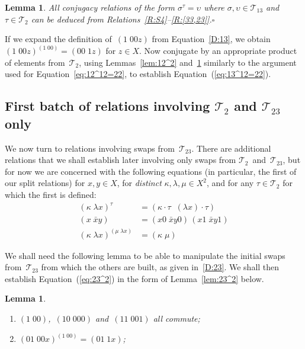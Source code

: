 \documentclass[a4paper,11pt]{article}
\numberwithin{equation}{section}
\newcommand{\eqstate}[1]{Equation~(\ref{#1})}
\newcommand{\swap}[2]{(#1\;#2)}
\newcommand{\Sw}[1]{\mathcal{T}_{#1}}
\newcommand{\qed}{\hspace*{\fill}$\square$}
\newtheorem{lemma}[thm]{Lemma}
\begin{document}
\begin{lemma}
  \label{lem:13^2}
  All conjugacy relations of the form $\sigma^{\tau} = \upsilon$ where
  $\sigma,\upsilon \in \Sw{13}$ and $\tau \in \Sw{2}$ can be deduced
  from Relations~\ref{R:S4}--\ref{R:[33,23]}.\qed
\end{lemma}

If we expand the definition of~$\swap{1}{00z}$ from
Equation~\eqref{D:13}, we obtain $\swap{1}{00z}^{\swap{1}{00}} =
\swap{00}{1z}$ for $z \in X$.  Now conjugate by an appropriate product
of elements from~$\Sw{2}$, using Lemmas~\ref{lem:12^2}
and~\ref{lem:13^2} similarly to the argument used for
Equation~\eqref{eq:12^12=22}, to establish \eqstate{eq:13^12=22}.

\subsection{\boldmath First batch of relations involving $\Sw{2}$ and
  $\Sw{23}$ only}

We now turn to relations involving swaps from~$\Sw{23}$.  There are
additional relations that we shall establish later involving only
swaps from $\Sw{2}$~and~$\Sw{23}$, but for now we are concerned with
the following equations (in particular, the first of our split
relations) for $x,y \in X$, for \emph{distinct} $\kappa,\lambda,\mu
\in X^{2}$, and for any $\tau \in \Sw{2}$ for which the first is
defined:
\begin{align}
  \swap{\kappa}{\lambda x}^{\tau} &=
  \swap{\kappa\!\cdot\!\tau\;}{(\lambda x)\!\cdot\!\tau}
  \label{eq:23^2}
  \\
  \swap{x}{\bar{x}y} &= \swap{x0}{\bar{x}y0} \, \swap{x1}{\bar{x}y1}
  \label{eq:12-split}
  \\
  \swap{\kappa}{\lambda x}^{\swap{\mu}{\lambda x}} &=
  \swap{\kappa}{\mu}
  \label{eq:23^23=22}
\end{align}

We shall need the following lemma to be able to manipulate the initial
swaps from~$\Sw{23}$ from which the others are built, as given
in~\eqref{D:23}.  We shall then establish \eqstate{eq:23^2} in the
form of Lemma~\ref{lem:23^2} below.

\begin{lemma}
  \label{lem:23help}
  \begin{enumerate}
  \item
    \label{23split-commute}
    $\swap{1}{00}$,~$\swap{10}{000}$ and~$\swap{11}{001}$ all commute;
  \item
    \label{(01,00x)-shrink}
    $\swap{01}{00x}^{\swap{1}{00}} = \swap{01}{1x}$;
  \end{enumerate}
\end{lemma}
\end{document}
